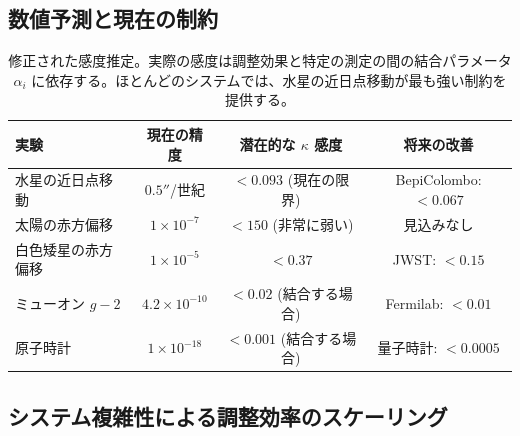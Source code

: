 \documentclass[11pt,a4paper]{article}
\begin{document}
	\subsection{数値予測と現在の制約}
	
	\begin{table}[htbp]
		\centering
		\small
	
			\begin{tabular}{lccc}
				\toprule
				\textbf{実験} & \textbf{現在の精度} & \textbf{潜在的な $\kappa$ 感度} & \textbf{将来の改善} \\
				\midrule
				水星の近日点移動 & $0.5''$/世紀 & $<0.093$ (現在の限界) & BepiColombo: $<0.067$ \\
				太陽の赤方偏移 & $1\times10^{-7}$ & $<150$ (非常に弱い) & 見込みなし \\
				白色矮星の赤方偏移 & $1\times10^{-5}$ & $<0.37$ & JWST: $<0.15$ \\
				ミューオン $g-2$ & $4.2\times10^{-10}$ & $<0.02$ (結合する場合) & Fermilab: $<0.01$ \\
				原子時計 & $1\times10^{-18}$ & $<0.001$ (結合する場合) & 量子時計: $<0.0005$ \\
				\bottomrule
			\end{tabular}
		
		\caption{修正された感度推定。実際の感度は調整効果と特定の測定の間の結合パラメータ $\alpha_i$ に依存する。ほとんどのシステムでは、水星の近日点移動が最も強い制約を提供する。}
	\end{table}
	
	\subsection{システム複雑性による調整効率のスケーリング}
	
\end{document}
